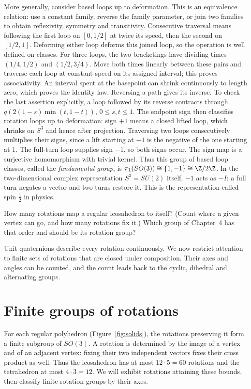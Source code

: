 More generally, consider based loops up to deformation. This is an equivalence
relation: use a constant family, reverse the family parameter, or join two
families to obtain reflexivity, symmetry and transitivity.
Consecutive traversal means following the first loop on $[0,1/2]$ at twice
its speed, then the second on $[1/2,1]$. Deforming either loop deforms this
joined loop, so the operation is well defined on classes.
For three loops, the two bracketings have dividing times $(1/4,1/2)$ and
$(1/2,3/4)$. Move both times linearly between these pairs and traverse each
loop at constant speed on its assigned interval; this proves associativity.
An interval spent at the basepoint can shrink continuously to length zero,
which proves the identity law. Reversing a path gives its inverse. To check the
last assertion explicitly, a loop followed by its reverse contracts through
$q(2(1-s)\min(t,1-t))$, $0\le s,t\le1$.
The endpoint sign then classifies rotation loops up to deformation:
sign $+1$ means a closed lifted loop, which shrinks on $S^3$ and hence
after projection. Traversing two loops consecutively multiplies their
signs, since a lift starting at $-1$ is the negative of the one starting
at $1$. The full-turn loop supplies sign $-1$, so both signs occur. The sign
map is a surjective homomorphism with trivial kernel. Thus this group of based loop classes,
called the \emph{fundamental group}, is
$\pi_1(SO(3))\cong\{1,-1\}\cong\Z/2\Z$.
In the two-dimensional complex representation $S^3=SU(2)$ itself, $-1$
acts as $-I$: a full turn negates a vector and two turns restore it.
This is the representation called spin $\tfrac12$ in physics.

\begin{think}
How many rotations map a regular icosahedron to itself? (Count where a given vertex can go, and how many rotations fix it.) Which group of Chapter~4 has that order and should be its rotation group?
\end{think}

Unit quaternions describe every rotation continuously. We now restrict attention to finite sets of rotations that are closed under composition. Their axes and angles can be counted, and the count leads back to the cyclic, dihedral and alternating groups.

\section{Finite groups of rotations}

For each regular polyhedron (Figure~\ref{fig:solids}), the rotations preserving it form a finite subgroup of $SO(3)$. A rotation is determined by the image of a vertex and of an adjacent vertex: fixing their two independent vectors fixes their cross product as well. Thus the icosahedron has at most $12\cdot5=60$ rotations and the tetrahedron at most $4\cdot3=12$. We will exhibit rotations attaining these bounds, then classify finite rotation groups by their axes.

